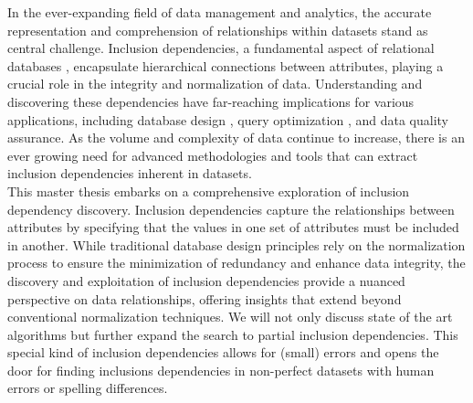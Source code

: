 In the ever-expanding field of data management and analytics, the accurate representation and comprehension of relationships within datasets stand as central challenge. Inclusion dependencies, a fundamental aspect of relational databases \cite{casanova1982inclusion}, encapsulate hierarchical connections between attributes, playing a crucial role in the integrity and normalization of data. Understanding and discovering these dependencies have far-reaching implications for various applications, including database design \cite{levene2000justification}, query optimization \cite{gryz1998query}, and data quality assurance. As the volume and complexity of data continue to increase, there is an ever growing need for advanced methodologies and tools that can extract inclusion dependencies inherent in datasets. \\

\noindent This master thesis embarks on a comprehensive exploration of inclusion dependency discovery. Inclusion dependencies capture the relationships between attributes by specifying that the values in one set of attributes must be included in another. While traditional database design principles rely on the normalization process to ensure the minimization of redundancy and enhance data integrity, the discovery and exploitation of inclusion dependencies provide a nuanced perspective on data relationships, offering insights that extend beyond conventional normalization techniques. We will not only discuss state of the art algorithms but further expand the search to partial inclusion dependencies. This special kind of inclusion dependencies allows for (small) errors and opens the door for finding inclusions dependencies in non-perfect datasets with human errors or spelling differences. 